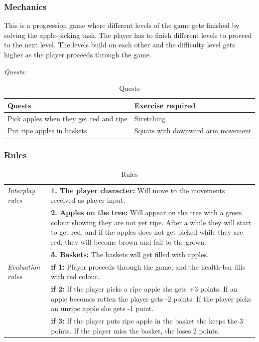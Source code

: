 \subsubsection{Mechanics} 
This is a progression game where different levels of the game gets finished by solving the apple-picking task. The player has to finish different levels to proceed to the next level. The levels build on each other and the difficulty level gets higher as the player proceeds through the game.

\emph{Quests:} 

\begin{table}
\begin{tabular}{|>{\raggedright}p{}|p{}|}
\hline
\textbf{Quests} & \textbf{Exercise required}  \\ \hline
Pick apples when they get red and ripe & Stretching  \\ \hline
Put ripe apples in baskets &  Squats with downward arm movement \\ \hline
\end{tabular}
\caption[Quests in the "Apple Picking" game]{Quests}
\label{tab:quests2}
\end{table}

\subsubsection{Rules} 

\begin{table} [H]
\centering
\begin{tabular}{|p{}|p{}|}
\hline
\emph{Interplay rules} & \textbf{1. The player character:} Will move to the movements received as player input. \\ \cline{2-2}
 &  \textbf{2. Apples on the tree:} Will appear on the tree with a green colour showing they are not yet ripe. After a while they will start to get red, and if the apples does not get picked while they are red, they will become brown and fall to the grown. \\ \cline{2-2}
& \textbf{3. Baskets:} The baskets will get filled with apples. \\ \hline
\emph{Evaluation rules} & \textbf{if 1:} Player proceeds through the game, and the health-bar fills with red colour.\\ \cline{2-2}
 & \textbf{if 2:} If the player picks a ripe apple she gets +3 points. If an apple becomes rotten the player gets -2 points. If the player picks an unripe apple she gets -1 point. \\ \cline{2-2}
& \textbf{if 3:} If the player puts ripe apple in the basket she keeps the 3 points. If the player miss the basket, she loses 2 points.  \\ \hline
\end{tabular}
\caption[Rules for the "Apple Picking" game]{Rules}
\label{tab:rules2}
\end{table}  

